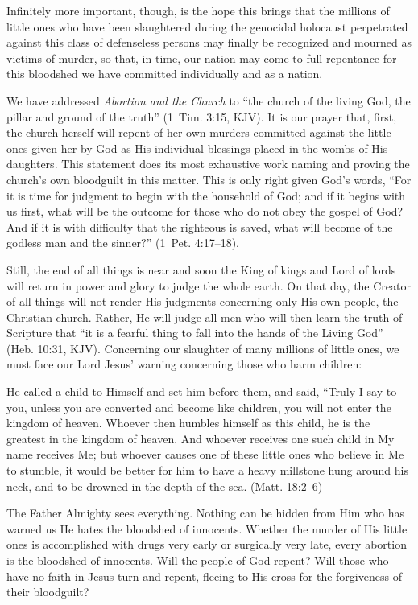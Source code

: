 \documentclass[
]{book}
\begin{document}
Infinitely more important, though, is the hope this brings that the millions of little ones who have been slaughtered during the genocidal holocaust perpetrated against this class of defenseless persons may finally be recognized and mourned as victims of murder, so that, in time, our nation may come to full repentance for this bloodshed we have committed individually and as a nation.

We have addressed \emph{Abortion and the Church} to ``the church of the living God, the pillar and ground of the truth'' (1~Tim. 3:15, KJV). It is our prayer that, first, the church herself will repent of her own murders committed against the little ones given her by God as His individual blessings placed in the wombs of His daughters. This statement does its most exhaustive work naming and proving the church's own bloodguilt in this matter. This is only right given God's words, ``For it is time for judgment to begin with the household of God; and if it begins with us first, what will be the outcome for those who do not obey the gospel of God? And if it is with difficulty that the righteous is saved, what will become of the godless man and the sinner?'' (1~Pet. 4:17--18).

Still, the end of all things is near and soon the King of kings and Lord of lords will return in power and glory to judge the whole earth. On that day, the Creator of all things will not render His judgments concerning only His own people, the Christian church. Rather, He will judge all men who will then learn the truth of Scripture that ``it is a fearful thing to fall into the hands of the Living God'' (Heb. 10:31, KJV). Concerning our slaughter of many millions of little ones, we must face our Lord Jesus' warning concerning those who harm children:

He called a child to Himself and set him before them, and said, ``Truly I say to you, unless you are converted and become like children, you will not enter the kingdom of heaven. Whoever then humbles himself as this child, he is the greatest in the kingdom of heaven. And whoever receives one such child in My name receives Me; but whoever causes one of these little ones who believe in Me to stumble, it would be better for him to have a heavy millstone hung around his neck, and to be drowned in the depth of the sea. (Matt. 18:2--6)

The Father Almighty sees everything. Nothing can be hidden from Him who has warned us He hates the bloodshed of innocents. Whether the murder of His little ones is accomplished with drugs very early or surgically very late, every abortion is the bloodshed of innocents. Will the people of God repent? Will those who have no faith in Jesus turn and repent, fleeing to His cross for the forgiveness of their bloodguilt?
\end{document}
